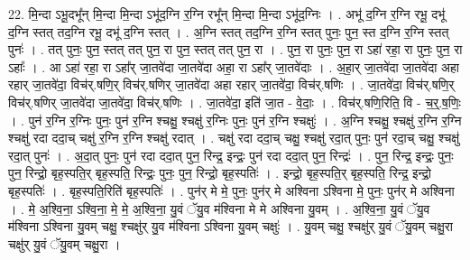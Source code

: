 \documentclass[17pt]{extarticle}
\begin{document}
22. मि॒न्दा ऽभू॒दभू᳚न् मि॒न्दा मि॒न्दा ऽभू॑द॒ग्नि र॒ग्नि रभू᳚न् मि॒न्दा मि॒न्दा ऽभू॑द॒ग्निः । . अभू॑ द॒ग्नि र॒ग्नि रभू॒ दभू॑ द॒ग्नि स्तत् तद॒ग्नि रभू॒ दभू॑ द॒ग्नि स्तत् । . अ॒ग्नि स्तत् तद॒ग्नि र॒ग्नि स्तत् पुनः॒ पुन॒ स्त द॒ग्नि र॒ग्नि स्तत् पुनः॑ । . तत् पुनः॒ पुन॒ स्तत् तत् पुन॒ रा पुन॒ स्तत् तत् पुन॒ रा । . पुन॒ रा पुनः॒ पुन॒ रा ऽहा॑ रहा॒ रा पुनः॒ पुन॒ रा ऽहाः᳚ । . आ ऽहा॑ रहा॒ रा ऽहा᳚र् जा॒तवे॑दा जा॒तवे॑दा अहा॒ रा ऽहा᳚र् जा॒तवे॑दाः । . अ॒हा॒र् जा॒तवे॑दा जा॒तवे॑दा अहा रहार् जा॒तवे॑दा॒ विच॑र्.षणि॒र् विच॑र्.षणिर् जा॒तवे॑दा अहा रहार् जा॒तवे॑दा॒ विच॑र्.षणिः । . जा॒तवे॑दा॒ विच॑र्.षणि॒र् विच॑र्.षणिर् जा॒तवे॑दा जा॒तवे॑दा॒ विच॑र्.षणिः । . जा॒तवे॑दा॒ इति॑ जा॒त - वे॒दाः॒ । . विच॑र्.षणि॒रिति॒ वि - च॒र्॒.ष॒णिः॒ । . पुन॑ र॒ग्नि र॒ग्निः पुनः॒ पुन॑ र॒ग्नि श्चक्षु॒ श्चक्षु॑ र॒ग्निः पुनः॒ पुन॑ र॒ग्नि श्चक्षुः॑ । . अ॒ग्नि श्चक्षु॒ श्चक्षु॑ र॒ग्नि र॒ग्नि श्चक्षु॑ रदा ददा॒च् चक्षु॑ र॒ग्नि र॒ग्नि श्चक्षु॑ रदात् । . चक्षु॑ रदा ददा॒च् चक्षु॒ श्चक्षु॑ रदा॒त् पुनः॒ पुन॑ रदा॒च् चक्षु॒ श्चक्षु॑ रदा॒त् पुनः॑ । . अ॒दा॒त् पुनः॒ पुन॑ रदा ददा॒त् पुन॒ रिन्द्र॒ इन्द्रः॒ पुन॑ रदा ददा॒त् पुन॒ रिन्द्रः॑ । . पुन॒ रिन्द्र॒ इन्द्रः॒ पुनः॒ पुन॒ रिन्द्रो॒ बृह॒स्पति॒र् बृह॒स्पति॒ रिन्द्रः॒ पुनः॒ पुन॒ रिन्द्रो॒ बृह॒स्पतिः॑ । . इन्द्रो॒ बृह॒स्पति॒र् बृह॒स्पति॒ रिन्द्र॒ इन्द्रो॒ बृह॒स्पतिः॑ । . बृह॒स्पति॒रिति॑ बृह॒स्पतिः॑ । . पुन॑र् मे मे॒ पुनः॒ पुन॑र् मे अश्विना ऽश्विना मे॒ पुनः॒ पुन॑र् मे अश्विना । . मे॒ अ॒श्वि॒ना॒ ऽश्वि॒ना॒ मे॒ मे॒ अ॒श्वि॒ना॒ यु॒वं ॅयु॒व म॑श्विना मे मे अश्विना यु॒वम् । . अ॒श्वि॒ना॒ यु॒वं ॅयु॒व म॑श्विना ऽश्विना यु॒वम् चक्षु॒ श्चक्षु॑र् यु॒व म॑श्विना ऽश्विना यु॒वम् चक्षुः॑ । . यु॒वम् चक्षु॒ श्चक्षु॑र् यु॒वं ॅयु॒वम् चक्षु॒रा चक्षु॑र् यु॒वं ॅयु॒वम् चक्षु॒रा । \newline
\end{document}
